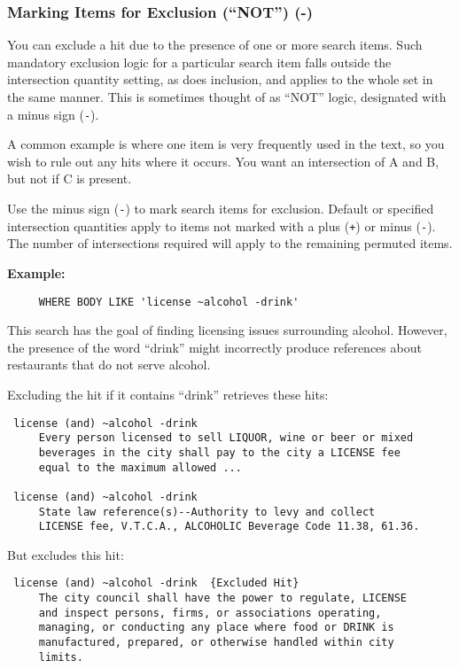 \subsubsection{Marking Items for Exclusion (``NOT'') (-)}

You can exclude a hit due to the presence of one or more search items.
Such mandatory exclusion logic for a particular search item falls
outside the intersection quantity setting, as does inclusion, and
applies to the whole set in the same manner.  This is sometimes
thought of as ``NOT'' logic, designated with a minus sign (\verb`-`).

A common example is where one item is very frequently used in the
text, so you wish to rule out any hits where it occurs.  You want an
intersection of A and B, but not if C is present.

Use the minus sign (\verb`-`) to mark search items for exclusion.
Default or specified intersection quantities apply to items not marked
with a plus (\verb`+`) or minus (\verb`-`).  The number of
intersections required will apply to the remaining permuted items.

{\bf Example:}
\begin{verbatim}
     WHERE BODY LIKE 'license ~alcohol -drink'
\end{verbatim}

This search has the goal of finding licensing issues surrounding
alcohol.  However, the presence of the word ``drink'' might
incorrectly produce references about restaurants that do not serve
alcohol.

Excluding the hit if it contains ``drink'' retrieves these hits:

\begin{verbatim}
 license (and) ~alcohol -drink
     Every person licensed to sell LIQUOR, wine or beer or mixed
     beverages in the city shall pay to the city a LICENSE fee
     equal to the maximum allowed ...

 license (and) ~alcohol -drink
     State law reference(s)--Authority to levy and collect
     LICENSE fee, V.T.C.A., ALCOHOLIC Beverage Code 11.38, 61.36.
\end{verbatim}

But excludes this hit:

\begin{verbatim}
 license (and) ~alcohol -drink  {Excluded Hit}
     The city council shall have the power to regulate, LICENSE
     and inspect persons, firms, or associations operating,
     managing, or conducting any place where food or DRINK is
     manufactured, prepared, or otherwise handled within city
     limits.
\end{verbatim}

